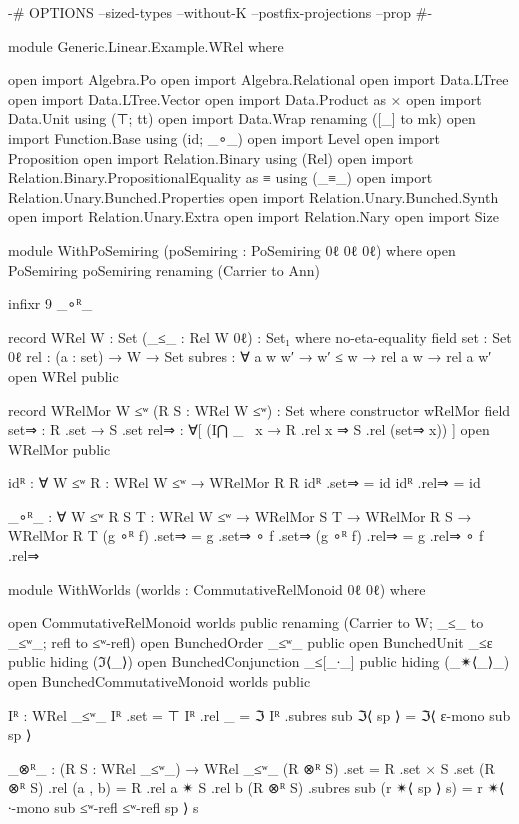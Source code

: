 \begin{code}
{-# OPTIONS --sized-types --without-K --postfix-projections --prop #-}

module Generic.Linear.Example.WRel where

  open import Algebra.Po
  open import Algebra.Relational
  open import Data.LTree
  open import Data.LTree.Vector
  open import Data.Product as ×
  open import Data.Unit using (⊤; tt)
  open import Data.Wrap renaming ([_] to mk)
  open import Function.Base using (id; _∘_)
  open import Level
  open import Proposition
  open import Relation.Binary using (Rel)
  open import Relation.Binary.PropositionalEquality as ≡ using (_≡_)
  open import Relation.Unary.Bunched.Properties
  open import Relation.Unary.Bunched.Synth
  open import Relation.Unary.Extra
  open import Relation.Nary
  open import Size

  module WithPoSemiring (poSemiring : PoSemiring 0ℓ 0ℓ 0ℓ) where
    open PoSemiring poSemiring renaming (Carrier to Ann)

    infixr 9 _∘ᴿ_

    record WRel {W : Set} (_≤_ : Rel W 0ℓ) : Set₁ where
      no-eta-equality
      field
        set : Set 0ℓ
        rel : (a : set) → W → Set
        subres : ∀ {a w w′} → w′ ≤ w → rel a w → rel a w′
    open WRel public

    record WRelMor {W ≤ʷ} (R S : WRel {W} ≤ʷ) : Set where
      constructor wRelMor
      field
        set⇒ : R .set → S .set
        rel⇒ : ∀[ (I⋂ _ \ x → R .rel x ⇒ S .rel (set⇒ x)) ]
    open WRelMor public

    idᴿ : ∀ {W ≤ʷ} {R : WRel {W} ≤ʷ} → WRelMor R R
    idᴿ .set⇒ = id
    idᴿ .rel⇒ = id

    _∘ᴿ_ : ∀ {W ≤ʷ} {R S T : WRel {W} ≤ʷ} →
      WRelMor S T → WRelMor R S → WRelMor R T
    (g ∘ᴿ f) .set⇒ = g .set⇒ ∘ f .set⇒
    (g ∘ᴿ f) .rel⇒ = g .rel⇒ ∘ f .rel⇒

    module WithWorlds
      (worlds : CommutativeRelMonoid 0ℓ 0ℓ)
      where

      open CommutativeRelMonoid worlds public renaming
        (Carrier to W; _≤_ to _≤ʷ_; refl to ≤ʷ-refl)
      open BunchedOrder _≤ʷ_ public
      open BunchedUnit _≤ε public hiding (ℑ⟨_⟩)
      open BunchedConjunction _≤[_∙_] public hiding (_✴⟨_⟩_)
      open BunchedCommutativeMonoid worlds public

      Iᴿ : WRel _≤ʷ_
      Iᴿ .set = ⊤
      Iᴿ .rel _ = ℑ
      Iᴿ .subres sub ℑ⟨ sp ⟩ = ℑ⟨ ε-mono sub sp ⟩

      _⊗ᴿ_ : (R S : WRel _≤ʷ_) → WRel _≤ʷ_
      (R ⊗ᴿ S) .set = R .set × S .set
      (R ⊗ᴿ S) .rel (a , b) = R .rel a ✴ S .rel b
      (R ⊗ᴿ S) .subres sub (r ✴⟨ sp ⟩ s) =
        r ✴⟨ ∙-mono sub ≤ʷ-refl ≤ʷ-refl sp ⟩ s


\end{code}
